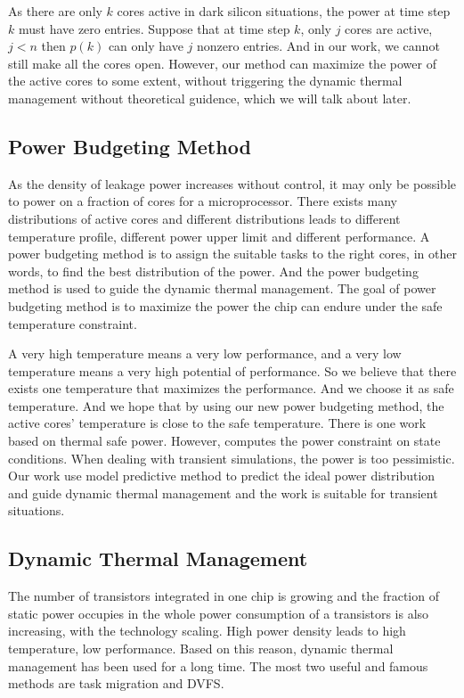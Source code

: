  As there are only $k$ cores active in dark silicon situations, the power at time step $k$ must have zero entries. Suppose that at time step $k$, only $j$ cores are active, $j<n$ then $p(k)$  can only have $j$ nonzero entries. And in our work, we cannot still make all the cores open. However, our method can maximize the power of the active cores to some extent, without triggering the dynamic thermal management without theoretical guidence, which we will talk about later.

\subsection{Power Budgeting Method}


As the density of leakage power increases without control, it may only be possible to power on a fraction of cores for a microprocessor. There exists many distributions of active cores and different distributions leads to different temperature profile, different power upper limit and different performance.
A power budgeting method is to assign the suitable tasks to the right cores, in other words, to find the best distribution of the power. And the power budgeting method is used to guide the dynamic thermal management. 
The goal of power budgeting method is to maximize the power the chip can endure under the safe temperature constraint.


A very high temperature means a very low performance, and a very low temperature means a very high potential of performance. So we believe that there exists one temperature that maximizes the performance. And we choose it as safe temperature. And we hope that by using our new power budgeting method, the active cores' temperature is close to the safe temperature. There is one work \cite{Pagani'14} based on thermal safe power. However, \cite{Pagani'14} computes the power constraint on state conditions. When dealing with transient simulations, the power is too pessimistic. Our work use model predictive method to predict the ideal power distribution and guide dynamic thermal management and the work is suitable for transient situations.



\subsection{Dynamic Thermal Management}

The number of transistors integrated in one chip is growing and the fraction of static power occupies in the whole power consumption of a transistors is also increasing, with the technology scaling. High power density leads to high temperature, low performance.
 Based on this reason, dynamic thermal management has been used for a long time. The most two useful and famous methods are task migration and DVFS. 


